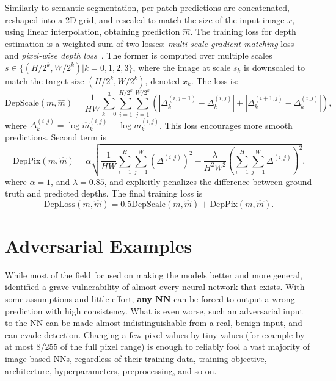 Similarly to semantic segmentation, per-patch predictions are concatenated, reshaped into a 2D grid, and rescaled to match the size of the input image $x$, using linear interpolation, obtaining prediction $\hat{m}$. The training loss for depth estimation is a weighted sum of two losses: \textit{multi-scale gradient matching} loss~\cite{depscaleloss} and \textit{pixel-wise depth loss}~\cite{adabins}. The former is computed over multiple scales $s\in\{(H/2^k,W/2^k)|k=0,1,2,3\}$, where the image at scale $s_k$ is downscaled to match the target size $(H/2^k,W/2^k)$, denoted $x_k$. The loss is:
\begin{equation}
    \text{DepScale}(m,\hat{m})=\frac{1}{HW}\sum_{k=0}^{3}
    \sum_{i=1}^{H/2^k}\sum_{j=1}^{W/2^k}\left(
        |\Delta_k^{(i,j+1)}-\Delta_k^{(i,j)}|+
        |\Delta_k^{(i+1,j)}-\Delta_k^{(i,j)}|
    \right)\text{,}
    \label{eq:depth_loss_scale}
\end{equation}
where $\Delta_k^{(i,j)}=\log\hat{m}_k^{(i,j)}-\log m_k^{(i,j)}$. This loss encourages more smooth predictions. Second term is 
\begin{equation}
    \text{DepPix}(m,\hat{m})=\alpha\sqrt{
        \frac{1}{HW}\sum_{i=1}^{H}\sum_{j=1}^{W}\left(\Delta^{(i,j)}\right)^2-
        \frac{\lambda}{H^2W^2}\left(\sum_{i=1}^{H}\sum_{j=1}^{W}\Delta^{(i,j)}\right)^2
    }\text{,}
    \label{eq:depth_pix}
\end{equation}
where $\alpha=1$, and $\lambda=0.85$, and explicitly penalizes the difference between ground truth and predicted depths. The final training loss is 
\begin{equation}
    \text{DepLoss}(m,\hat{m})=0.5\text{DepScale}(m,\hat{m})+\text{DepPix}(m,\hat{m})\text{.}
    \label{eq:deploss}
\end{equation}


\section{Adversarial Examples}\label{sec:advex_bg}

While most of the field focused on making the models better and more general,~\cite{advex} identified a grave vulnerability of almost every neural network that exists. With some assumptions and little effort, \textbf{any NN} can be forced to output a wrong prediction with high consistency. What is even worse, such an adversarial input to the NN can be made almost indistinguishable from a real, benign input, and can evade detection. Changing a few pixel values by tiny values (for example by at most 8/255 of the full pixel range) is enough to reliably fool a vast majority of image-based NNs, regardless of their training data, training objective, architecture, hyperparameters, preprocessing, and so on.

